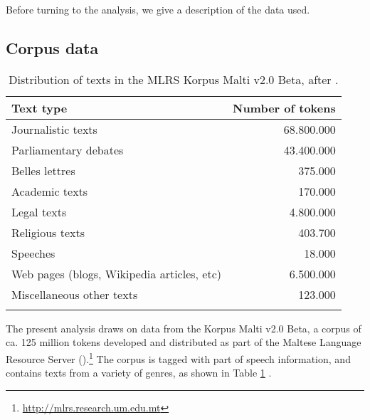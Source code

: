\documentclass[output=paper]{LSP/langsci}
\begin{document}
Before turning to the analysis, we give a description of the data used.

\subsection{Corpus data}\label{sec:data}

\begin{table}

\begin{tabularx}{\textwidth}{Xr}
\lsptoprule
Text type &	Number of tokens \\
\midrule
Journalistic texts &	68.800.000\\
Parliamentary debates & 43.400.000\\
Belles lettres & 375.000\\
Academic texts &	170.000\\
Legal texts & 4.800.000\\
Religious texts	& 403.700\\
Speeches & 18.000\\
Web pages (blogs, Wikipedia articles, etc) & 6.500.000\\
Miscellaneous other texts & 123.000\\
\lspbottomrule
\end{tabularx}
\caption{Distribution of texts in the MLRS Korpus Malti v2.0 Beta, after \citet{GattCeplo2013}.}
\label{table:gatt:corpus-dist}
\end{table}

The present analysis draws on data from the Korpus Malti v2.0 Beta, a corpus of ca. 125 million tokens developed and distributed as part of the Maltese Language Resource Server ().\footnote{\url{http://mlrs.research.um.edu.mt}}
The corpus is tagged with part of speech information, and contains texts from a variety of genres, as shown in Table \ref{table:gatt:corpus-dist} \citep{GattCeplo2013}.
\end{document}
